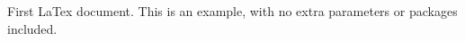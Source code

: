\documentclass{article}
\begin{document}
First LaTex document. This is an example, with no extra parameters or packages included. 
\end{document}

